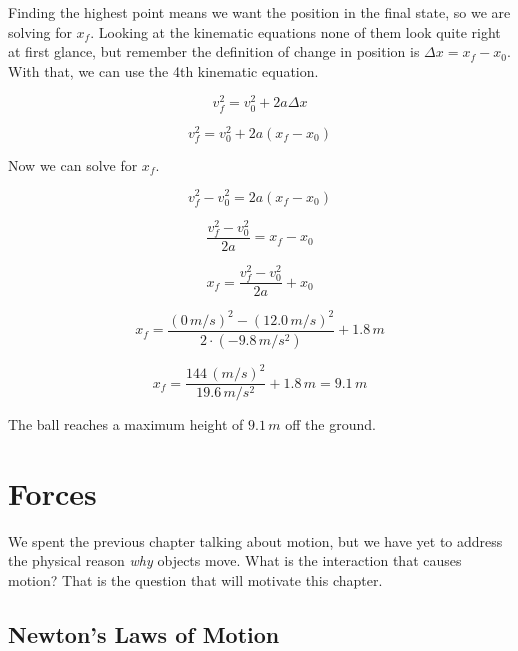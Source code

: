 \documentclass[12pt]{book}
\begin{document}
Finding the highest point means we want the position in the final state, so we are solving for $x_f$. Looking at the kinematic equations none of them look quite right at first glance, but remember the definition of change in position is $\Delta x = x_f - x_0$. With that, we can use the 4th kinematic equation.

\begin{equation}
v_f^2 = v_0^2 + 2 a \Delta x
\end{equation}

\begin{equation}
v_f^2 = v_0^2 + 2 a (x_f - x_0)
\end{equation}

Now we can solve for $x_f$.

\begin{equation}
v_f^2 - v_0^2 = 2 a (x_f - x_0)
\end{equation}

\begin{equation}
\frac{v_f^2 - v_0^2}{2 a} = x_f - x_0
\end{equation}

\begin{equation}
x_f = \frac{v_f^2 - v_0^2}{2 a} + x_0
\end{equation}

\begin{equation}
x_f = \frac{(0 \, m/s)^2 - (12.0 \, m/s)^2}{2 \cdot (-9.8 \, m/s^2)} + 1.8 \, m
\end{equation}

\begin{equation}
x_f = \frac{144 \, (m/s)^2}{19.6 \, m/s^2} + 1.8 \, m = 9.1 \, m
\end{equation}

The ball reaches a maximum height of $9.1 \, m$ off the ground.

\linespace

\chapter{Forces}
\setcounter{example}{1}
\addtocounter{chp}{1}

We spent the previous chapter talking about motion, but we have yet to address the physical reason \textit{why} objects move. What is the interaction that causes motion? That is the question that will motivate this chapter.

\section{Newton's Laws of Motion}
\end{document}
